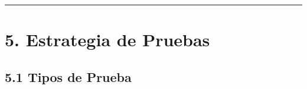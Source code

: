 \documentclass[10pt,a4paper]{article}
\begin{document}
\begin{center}\rule{0.5\linewidth}{0.5pt}\end{center}


\section{5. Estrategia de Pruebas}\label{5-estrategia-de-pruebas}


\subsection{5.1 Tipos de Prueba}\label{51-tipos-de-prueba}

\begingroup\singlespacing\footnotesize\setlength{\parskip}{0pt}
\end{document}
